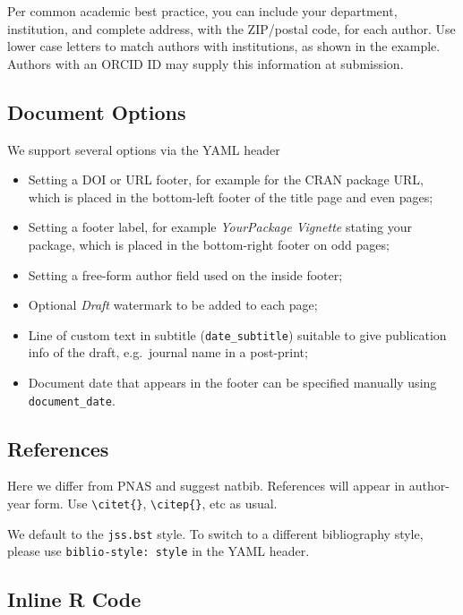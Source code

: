 \documentclass[letterpaper,9pt,twocolumn,twoside,]{pinp}
\providecommand{\tightlist}{%
  \setlength{\itemsep}{0pt}\setlength{\parskip}{0pt}}
\begin{document}
Per common academic best practice, you can include your department,
institution, and complete address, with the ZIP/postal code, for each
author. Use lower case letters to match authors with institutions, as
shown in the example. Authors with an ORCID ID may supply this
information at submission.

\hypertarget{document-options}{%
\subsection{Document Options}\label{document-options}}

We support several options via the YAML header

\begin{itemize}
\tightlist
\item
  Setting a DOI or URL footer, for example for the CRAN package URL,
  which is placed in the bottom-left footer of the title page and even
  pages;
\item
  Setting a footer label, for example \emph{YourPackage Vignette}
  stating your package, which is placed in the bottom-right footer on
  odd pages;
\item
  Setting a free-form author field used on the inside footer;
\item
  Optional \emph{Draft} watermark to be added to each page;
\item
  Line of custom text in subtitle (\texttt{date\_subtitle}) suitable to
  give publication info of the draft, e.g.~journal name in a post-print;
\item
  Document date that appears in the footer can be specified manually
  using \texttt{document\_date}.
\end{itemize}

\hypertarget{references}{%
\subsection{References}\label{references}}

Here we differ from PNAS and suggest natbib. References will appear in
author-year form. Use \texttt{\textbackslash{}citet\{\}},
\texttt{\textbackslash{}citep\{\}}, etc as usual.

We default to the \texttt{jss.bst} style. To switch to a different
bibliography style, please use \texttt{biblio-style:\ style} in the YAML
header.

\hypertarget{inline-r-code}{%
\subsection{Inline R Code}\label{inline-r-code}}
\end{document}
